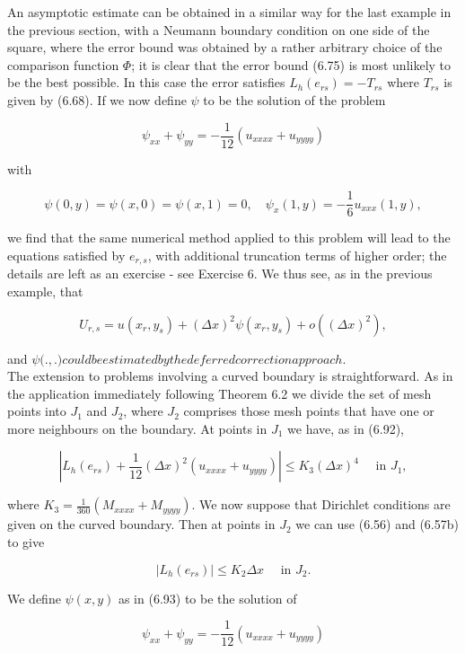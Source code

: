 \documentclass[10pt]{article}
\begin{document}
An asymptotic estimate can be obtained in a similar way for the last example in the previous section, with a Neumann boundary condition on one side of the square, where the error bound was obtained by a rather arbitrary choice of the comparison function \(\Phi\); it is clear that the error bound (6.75) is most unlikely to be the best possible. In this case the error satisfies \(L_{h}\left(e_{r s}\right)=-T_{r s}\) where \(T_{r s}\) is given by (6.68). If we now define \(\psi\) to be the solution of the problem

\[
\psi_{x x}+\psi_{y y}=-\frac{1}{12}\left(u_{x x x x}+u_{y y y y}\right)
\]

with

\[
\psi(0, y)=\psi(x, 0)=\psi(x, 1)=0, \quad \psi_{x}(1, y)=-\frac{1}{6} u_{x x x}(1, y),
\]

we find that the same numerical method applied to this problem will lead to the equations satisfied by \(e_{r, s}\), with additional truncation terms of higher order; the details are left as an exercise - see Exercise 6. We thus see, as in the previous example, that

\[
U_{r, s}=u\left(x_{r}, y_{s}\right)+(\Delta x)^{2} \psi\left(x_{r}, y_{s}\right)+o\left((\Delta x)^{2}\right),
\]

and \(\psi(.,\).\() could be estimated by the deferred correction approach.\)\\
The extension to problems involving a curved boundary is straightforward. As in the application immediately following Theorem 6.2 we divide the set of mesh points into \(J_{1}\) and \(J_{2}\), where \(J_{2}\) comprises those mesh points that have one or more neighbours on the boundary. At points in \(J_{1}\) we have, as in (6.92),

\[
\left|L_{h}\left(e_{r s}\right)+\frac{1}{12}(\Delta x)^{2}\left(u_{x x x x}+u_{y y y y}\right)\right| \leq K_{3}(\Delta x)^{4} \quad \text { in } J_{1},
\]

where \(K_{3}=\frac{1}{360}\left(M_{x x x x}+M_{y y y y}\right)\). We now suppose that Dirichlet conditions are given on the curved boundary. Then at points in \(J_{2}\) we can use (6.56) and (6.57b) to give

\[
\left|L_{h}\left(e_{r s}\right)\right| \leq K_{2} \Delta x \quad \text { in } J_{2} .
\]

We define \(\psi(x, y)\) as in (6.93) to be the solution of

\[
\psi_{x x}+\psi_{y y}=-\frac{1}{12}\left(u_{x x x x}+u_{y y y y}\right)
\]
\end{document}
